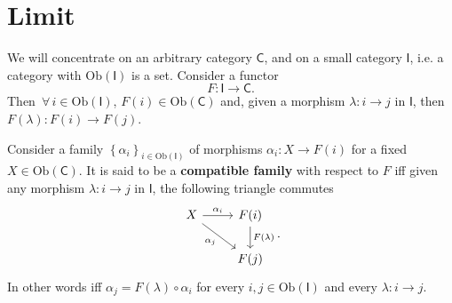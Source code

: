 \section{Limit}
We will concentrate on an arbitrary category $\mathsf{C}$, and on a small category $\mathsf{I}$, i.e. a category with $\mathrm{Ob} \left(\mathsf{I}\right)$ is a set.
Consider a functor 
\begin{equation}
F: \mathsf{I} \to \mathsf{C}
.\end{equation} 
Then $\,\forall\, i \in \mathrm{Ob} \left(\mathsf{I}\right)$, $F(i) \in \mathrm{Ob} \left(\mathsf{C}\right)$ and,
given a morphism $\lambda: i \to j$ in $\mathsf{I}$, then $F(\lambda): F(i) \to F(j)$.

\begin{defn}
	Consider a family $\left\{ \alpha_i \right\}_{i \in \mathrm{Ob} \left(\mathsf{I}\right)}$ of morphisms 
	$\alpha_i: X \to F(i)$ for a fixed $X \in \mathrm{Ob} \left(\mathsf{C}\right)$.
	It is said to be a \textbf{compatible family} with respect to $F$ iff
	given any morphism $\lambda: i \to j$ in $\mathsf{I}$, the following triangle commutes
	\begin{equation}
	\begin{tikzcd}
		X \arrow[r, "\alpha_i", rightarrow] \arrow[rd, "\alpha_j"', rightarrow] &
		F(i) \arrow[d, "F(\lambda)", rightarrow] \\
		&
		F(j)
	\end{tikzcd}
	.\end{equation} 
	In other words iff $\alpha_j = F(\lambda) \circ \alpha_i$ for every $i, j \in \mathrm{Ob} \left(\mathsf{I}\right)$ and every $\lambda: i \to j$.
\end{defn}

